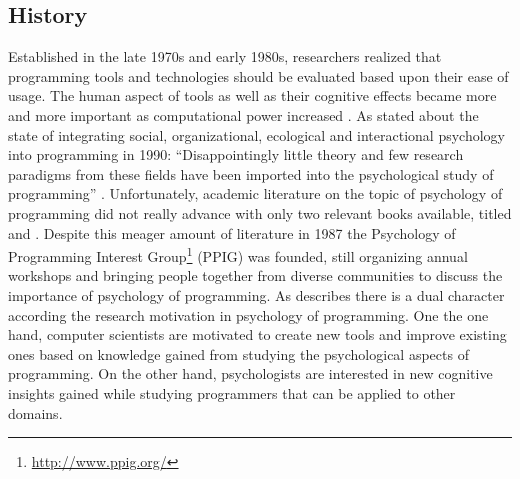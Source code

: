 \subsection{History}
\label{history-of-psychology-of-programming}
Established in the late 1970s and early 1980s, researchers realized that programming tools and technologies should be evaluated based upon their ease of usage.
The human aspect of tools as well as their cognitive effects became more and more important as computational power increased \autocite{sajaniemi_psychology_2008}.
As \citeauthor{curtis_psychology_1990} stated about the state of integrating social, organizational, ecological and interactional psychology into programming in 1990: ``Disappointingly little theory and few research paradigms from these fields have been imported into the psychological study of programming'' \autocite[253]{curtis_psychology_1990}.
Unfortunately, academic literature on the topic of psychology of programming did not really advance with only two relevant books available, titled  \autocite{weinberg_psychology_1971} and  \autocite{hoc_psychology_1990}.
Despite this meager amount of literature in 1987 the Psychology of Programming Interest Group\footnote{\url{http://www.ppig.org/}} (PPIG) was founded, still organizing annual workshops and bringing people together from diverse communities to discuss the importance of psychology of programming.
As \textcite{sajaniemi_psychology_2008} describes there is a dual character according the research motivation in psychology of programming.
One the one hand, computer scientists are motivated to create new tools and improve existing ones based on knowledge gained from studying the psychological aspects of programming.
On the other hand, psychologists are interested in new cognitive insights gained while studying programmers that can be applied to other domains.

